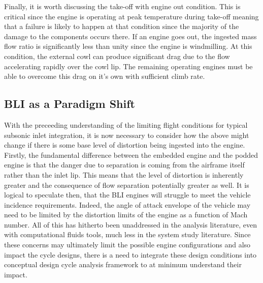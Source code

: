 \documentclass[12pt]{gatech-thesis}
\begin{document}
Finally, it is worth discussing the take-off with engine out condition.  This is critical since the engine is operating at peak temperature during take-off meaning that a failure is likely to happen at that condition since the majority of the damage to the components occurs there.  If an engine goes out, the ingested mass flow ratio is significantly less than unity since the engine is windmilling.  At this condition, the external cowl can produce significant drag due to the flow accelerating rapidly over the cowl lip.  The remaining operating engines must be able to overcome this drag on it's own with sufficient climb rate.  

\subsection{BLI as a Paradigm Shift}
\indent With the preceeding understanding of the limiting flight conditions for typical subsonic inlet integration, it is now necessary to consider how the above might change if there is some base level of distortion being ingested into the engine.  Firstly, the fundamental difference between the embedded engine and the podded engine is that the danger due to separation is coming from the airframe itself rather than the inlet lip.  This means that the level of distortion is inherently greater and the consequence of flow separation potentially greater as well.  It is logical to speculate then, that the BLI engines will struggle to meet the vehicle incidence requirements.  Indeed, the angle of attack envelope of the vehicle may need to be limited by the distortion limits of the engine as a function of Mach number.  All of this has hitherto been unaddressed in the analysis literature, even with computational fluids tools, much less in the system study literature.  Since these concerns may ultimately limit the possible engine configurations and also impact the cycle designs, there is a need to integrate these design conditions into conceptual design cycle analysis framework to at minimum understand their impact.  
\end{document}
